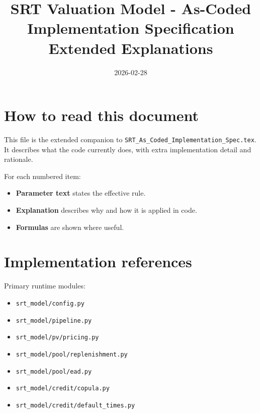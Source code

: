 \documentclass[11pt]{article}
\title{SRT Valuation Model - As-Coded Implementation Specification\\Extended Explanations}
\date{2026-02-28}
\begin{document}
\maketitle

\section*{How to read this document}
This file is the extended companion to \texttt{SRT\_As\_Coded\_Implementation\_Spec.tex}.  
It describes what the code currently does, with extra implementation detail and rationale.

For each numbered item:
\begin{itemize}
  \item \textbf{Parameter text} states the effective rule.
  \item \textbf{Explanation} describes why and how it is applied in code.
  \item \textbf{Formulas} are shown where useful.
\end{itemize}

\section*{Implementation references}
Primary runtime modules:
\begin{itemize}
  \item \texttt{srt\_model/config.py}
  \item \texttt{srt\_model/pipeline.py}
  \item \texttt{srt\_model/pv/pricing.py}
  \item \texttt{srt\_model/pool/replenishment.py}
  \item \texttt{srt\_model/pool/ead.py}
  \item \texttt{srt\_model/credit/copula.py}
  \item \texttt{srt\_model/credit/default\_times.py}
\end{itemize}
\end{document}

